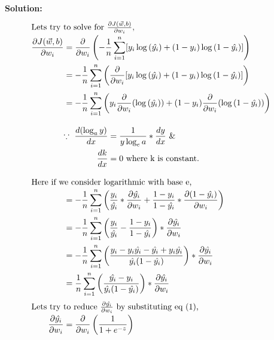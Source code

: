 \documentclass[11pt]{article}
\begin{document}
\textbf{Solution:}
\begin{align}
    \intertext{Lets try to solve for $\frac{\partial{J(\vec{w}, b)}}{\partial{w_i}}$,}\notag\\[-7mm]
    \frac{\partial{J(\vec{w}, b)}}{\partial{w_i}} & = \frac{\partial}{\partial{w_i}}\left( -\frac{1}{n} \displaystyle\sum_{i=1}^{n} [ y_i \log{(\hat{y_i})} + (1 - y_i) \log{(1 - \hat{y_i})} ] \right) \notag\\
    & = -\frac{1}{n} \displaystyle\sum_{i=1}^{n} \left( \frac{\partial}{\partial{w_i}}[ y_i \log{(\hat{y_i})} + (1 - y_i) \log{(1 - \hat{y_i})} ] \right) \notag\\
    & = -\frac{1}{n} \displaystyle\sum_{i=1}^{n} \left( y_i \frac{\partial}{\partial{w_i}}(\log{(\hat{y_i})}) + (1 - y_i) \frac{\partial}{\partial{w_i}}(\log{(1 - \hat{y_i})}) \right) \notag\\[3mm]
    & \begin{aligned}
        \because\ \frac{d(\log_a y)}{dx} &= \frac{1}{y \log_e a} * \frac{dy}{dx} \text{ \&} \\
        \frac{dk}{dx} &= 0 \text{ where k is constant.}
    \end{aligned} \\[3mm]
    \intertext{Here if we consider logarithmic with base e,}\notag\\[-7mm]
    & = -\frac{1}{n} \displaystyle\sum_{i=1}^{n} \left( \frac{y_i}{\hat{y_i}} * \frac{\partial{\hat{y_i}}}{\partial{w_i}} + \frac{1 - y_i}{1 - \hat{y_i}} * \frac{\partial{(1 - \hat{y_i})}}{\partial{w_i}} \right) \notag\\
    & = -\frac{1}{n} \displaystyle\sum_{i=1}^{n} \left( \frac{y_i}{\hat{y_i}} - \frac{1 - y_i}{1 - \hat{y_i}} \right) * \frac{\partial{\hat{y_i}}}{\partial{w_i}} \notag\\
    & = -\frac{1}{n} \displaystyle\sum_{i=1}^{n} \left( \frac{y_i - y_i \hat{y_i} - \hat{y_i} + y_i \hat{y_i}}{\hat{y_i}(1 - \hat{y_i})} \right) * \frac{\partial{\hat{y_i}}}{\partial{w_i}} \notag\\
    & = \frac{1}{n} \displaystyle\sum_{i=1}^{n} \left( \frac{\hat{y_i} - y_i}{\hat{y_i}(1 - \hat{y_i})} \right) * \frac{\partial{\hat{y_i}}}{\partial{w_i}} \\
    \intertext{Lets try to reduce $\frac{\partial{\hat{y_i}}}{\partial{w_i}}$ by substituting eq (1),}\notag\\[-7mm]
    \frac{\partial{\hat{y_i}}}{\partial{w_i}} & = \frac{\partial}{\partial{w_i}} \left( \frac{1}{1+e^{-z}} \right) \notag\\

\end{align}
\end{document}
